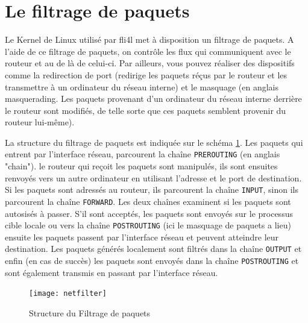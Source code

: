 
\section{Le filtrage de paquets}

\newcommand{\fwaction}[1]{{\small\textsf{#1}}}
\newcommand{\fwchain}[1]{\texttt{#1}}
\newcommand{\fwtable}[1]{\textsc{#1}}
\newcommand{\fwmatch}[1]{\texttt{#1}}
\newcommand{\fwpktstate}[1]{\texttt{#1}}
\newcommand{\fwloglevel}[1]{\texttt{#1}}
\newcommand{\protocol}[1]{\texttt{#1}}
\newcommand{\host}[1]{\texttt{#1}}
\newcommand{\package}[1]{\texttt{#1}}

  Le Kernel de Linux utilisé par fli4l met à disposition un filtrage de paquets.
  A l'aide de ce filtrage de paquets, on contrôle les flux qui communiquent avec
  le routeur et au de là de celui-ci. Par ailleurs, vous pouvez réaliser des
  dispositifs comme la redirection de port (redirige les paquets réçus par le
  routeur et les transmettre à un ordinateur du réseau interne) et le masquage
  (en anglais masquerading. Les paquets provenant d'un ordinateur du réseau
  interne derrière le routeur sont modifiés, de telle sorte que ces paquets
  semblent provenir du routeur lui-même).

  La structure du filtrage de paquets est indiquée sur le schéma
  \ref{fig:netfilter}. Les paquets qui entrent par l'interface réseau, parcourent
  la chaîne \fwchain{PREROUTING} (en anglais "chain"). le routeur qui reçoit les
  paquets sont manipulés, ils sont ensuites renvoyés vers un autre ordinateur en
  utilisant l'adresse et le port de destination. Si les paquets sont adressés
  au routeur, ils parcourent la chaîne \fwchain{INPUT}, sinon ils parcourent
  la chaîne \fwchain{FORWARD}. Les deux chaînes examinent si les paquets sont
  autosisés à passer. S'il sont acceptés, les paquets sont envoyés sur le
  processus cible locale ou vers la chaîne \fwchain{POSTROUTING} (ici le
  masquage de paquets a lieu) ensuite les paquets passent par l'interface réseau
  et peuvent atteindre leur destination. Les paquets générés localement sont
  filtrés dans la chaîne \fwchain{OUTPUT} et enfin (en cas de succès) les paquets
  sont envoyés dans la chaîne \fwchain{POSTROUTING} et sont également transmis
  en passant par l'interface réseau.

  \begin{figure}[htbp]
    \centering
    \texttt{[image: netfilter]}
    \caption{Structure du Filtrage de paquets}
    \label{fig:netfilter}
  \end{figure}

